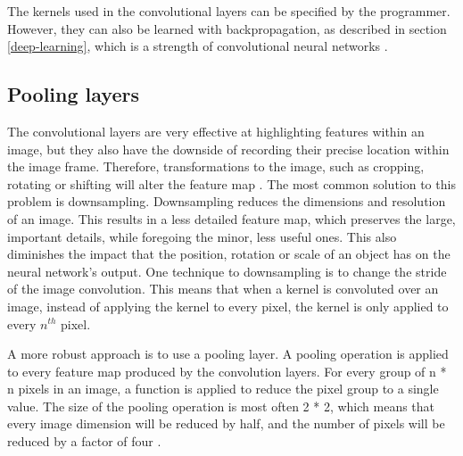 ﻿\documentclass[12pt,a4paper,notitlepage]{article}
\begin{document}
The kernels used in the convolutional layers can be specified by the programmer. However, they can also be learned with backpropagation, as described in section \ref{deep-learning}, which is a strength of convolutional neural networks \cite{brownlee_gentle_2019}.

\subsection{Pooling layers}
The convolutional layers are very effective at highlighting features within an image, but they also have the downside of recording their precise location within the image frame. Therefore, transformations to the image, such as cropping, rotating or shifting will alter the feature map \cite{brownlee_gentle_2019}.
The most common solution to this problem is downsampling. Downsampling reduces the dimensions and resolution of an image. This results in a less detailed feature map, which preserves the large, important details, while foregoing the minor, less useful ones. This also diminishes the impact that the position, rotation or scale of an object has on the neural network's output.
One technique to downsampling is to change the stride of the image convolution. This means that when a kernel is convoluted over an image, instead of applying the kernel to every pixel, the kernel is only applied to every \(n^{th}\) pixel.

A more robust approach is to use a pooling layer. A pooling operation is applied to every feature map produced by the convolution layers. For every group of n * n pixels in an image, a function is applied to reduce the pixel group to a single value. The size of the pooling operation is most often 2 * 2, which means that every image dimension will be reduced by half, and the number of pixels will be reduced by a factor of four \cite{brownlee_gentle_2019}.
\end{document}
